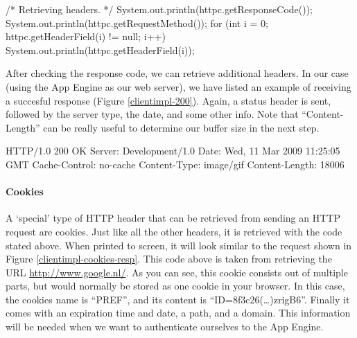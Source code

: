 \begin{figure*}[ht] %
\begin{center}
\begin{code}
/* Retrieving headers. */
System.out.println(httpc.getResponseCode());
System.out.println(httpc.getRequestMethod());
for (int i = 0; httpc.getHeaderField(i) != null; i++) {
    System.out.println(httpc.getHeaderField(i));
}
\end{code}
\caption{Retrieving HTTP response headers.\label{clientimpl-headers}}
\end{center}
\end{figure*}

After checking the response code, we can retrieve additional headers. In our case
(using the App Engine as our web server), we have listed an example of receiving
a succesful response (Figure \ref{clientimpl-200}). Again, a status header is
sent, followed by the server type, the date, and some other info. Note that
``Content-Length'' can be really useful to determine our buffer size in the next
step.

\begin{figure*}[ht] %
\begin{center}
\begin{code}
HTTP/1.0 200 OK
Server: Development/1.0
Date: Wed, 11 Mar 2009 11:25:05 GMT
Cache-Control: no-cache
Content-Type: image/gif
Content-Length: 18006
\end{code}
\caption{Example of HTTP response headers.\label{clientimpl-200}}
\end{center}
\end{figure*}

\paragraph{Cookies}
\label{clientimpl-cookies}
A `special' type of HTTP header that can be retrieved from sending an HTTP
request are cookies. Just like all the other headers, it is retrieved with the
code stated above. When printed to screen, it will look similar to the request
shown in Figure \ref{clientimpl-cookies-resp}. This code above is taken from
retrieving the URL \url{http://www.google.nl/}. As you can see, this cookie
consists out of multiple parts, but would normally be stored as one cookie in your
browser. In this case, the cookies name is ``PREF'', and its content is
``ID=8f3c26(\ldots)zrigB6''. Finally it comes with an expiration time and date,
a path, and a domain. This information will be needed when we want to authenticate
ourselves to the App Engine.

